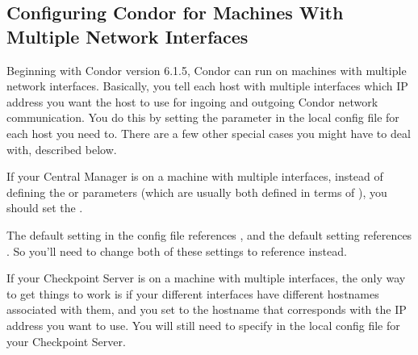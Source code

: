 \subsection{\label{sec:Multiple-Interfaces}Configuring Condor for
Machines With Multiple Network Interfaces } 

Beginning with Condor version 6.1.5, Condor can run on machines with
multiple network interfaces.
Basically, you tell each host with multiple interfaces which IP
address you want the host to use for ingoing and outgoing Condor
network communication.
You do this by setting the  parameter in
the local config file for each host you need to.
There are a few other special cases you might have to deal with,
described below.

If your Central Manager is on a machine with multiple interfaces,
instead of defining the  or
 parameters (which are usually both defined in
terms of ), you should set the
.

\Warn The default  setting in the
config file references , and the default
 setting references
.
So you'll need to change both of these settings to reference
 instead.   

If your Checkpoint Server is on a machine with multiple interfaces,
the only way to get things to work is if your different interfaces
have different hostnames associated with them, and you set
 to the hostname that corresponds with the
IP address you want to use.  
You will still need to specify  in the local
config file for your Checkpoint Server.
